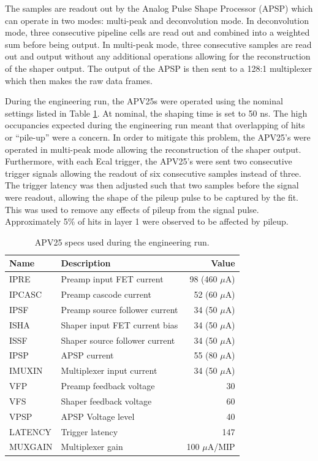 The samples  are readout out by the Analog Pulse Shape Processor (APSP) which
can operate in two modes: multi-peak and deconvolution mode.  In deconvolution
mode, three consecutive pipeline cells are read out and combined into a 
weighted sum before being output. In multi-peak mode, three consecutive samples are
read out and output without any additional operations allowing for the 
reconstruction of the shaper output.  The output of 
the APSP is then sent to a 128:1 multiplexer which then makes the raw data 
frames. 

During the engineering run, the APV25s were operated using the nominal settings
listed in Table \ref{tab:apv_specs}.  At nominal, the shaping time is set
to 50 ns.  The high occupancies expected during the engineering
run meant that overlapping of hits or ``pile-up'' were a concern.  In order to 
mitigate this problem, the APV25's were operated in multi-peak mode allowing 
the reconstruction of the shaper output.  Furthermore, 
with each Ecal trigger, the APV25's were sent two consecutive trigger signals 
allowing the readout of six consecutive samples instead of three.  The trigger
latency was then adjusted such that two samples before the signal were readout, 
allowing the shape of the pileup pulse to be captured by the fit.  This was 
used to remove any effects of pileup from the signal pulse.  Approximately 5\%
of hits in layer 1 were observed to be affected by pileup.
\begin{table}[ht]
    \centering
    \begin{tabular}{llr}
        \toprule
        \textbf{Name} & \textbf{Description} & \textbf{Value} \\
        \midrule
        \midrule
        IPRE   & Preamp input FET current       & 98 (460 $\mu$A)\\
        IPCASC & Preamp cascode current         & 52 (60 $\mu$A) \\
        IPSF   & Preamp source follower current & 34 (50 $\mu$A) \\
        ISHA   & Shaper input FET current bias  & 34 (50 $\mu$A) \\
        ISSF   & Shaper source follower current & 34 (50 $\mu$A) \\
        IPSP   & APSP current                   & 55 (80 $\mu$A) \\
        IMUXIN & Multiplexer input current      & 34 (50 $\mu$A) \\
        VFP    & Preamp feedback voltage        & 30  \\
        VFS    & Shaper feedback voltage        & 60  \\
        VPSP   & APSP Voltage level             & 40  \\
        LATENCY & Trigger latency               & 147 \\
        MUXGAIN & Multiplexer gain              & 100 $\mu$A/MIP \\
        \bottomrule
    \end{tabular}
    \caption{APV25 specs used during the engineering run.}
    \label{tab:apv_specs}
\end{table}
